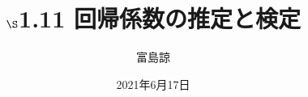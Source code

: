 \documentclass[a4paper,10pt,dvipdfmx]{jsarticle}
\begin{document}
\title{\vspace{-2cm}$\S$1.11 回帰係数の推定と検定}
\author{富島諒}
\date{2021年6月17日}

\maketitle




\end{document}
